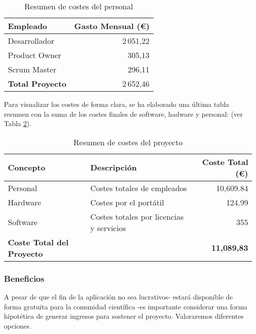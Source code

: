 \begin{enumerate}
		\begin{table}[h]
			\centering
			\begin{tabularx}
				{300}{@{}Xr@{}} \toprule \textbf{Empleado} & \textbf{Gasto Mensual (€)}\\
				\midrule Desarrollador & 2\,051,22 \\ Product Owner & 305,13 \\ Scrum Master
				& 296,11 \\ \midrule \textbf{Total Proyecto} & 2\,652,46 \\ \bottomrule
			\end{tabularx}
			\caption{Resumen de costes del personal}
			\label{tab:costes-empleados}
		\end{table}
\end{enumerate}

Para visualizar los costes de forma clara, se ha elaborado una última tabla resumen con la suma de los costes finales de software, hadware y personal: (ver Tabla \ref{tab:costes-totales}).

\begin{table}[h]
\centering
\begin{tabularx}{\textwidth}{@{}lXr@{}}
\toprule
\textbf{Concepto} & \textbf{Descripción} & \textbf{Coste Total (€)} \\
\midrule
Personal & Costes totales de empleados & 10,609.84 \\
Hardware & Costes por el portátil & 124.99 \\
Software & Costes totales por licencias y servicios & 355 \\
\midrule
\textbf{Coste Total del Proyecto} & & \textbf{11,089,83} \\
\bottomrule
\end{tabularx}
\caption{Resumen de costes del proyecto}
\label{tab:costes-totales}
\end{table}


\subsubsection{Beneficios}

A pesar de que el fin de la aplicación no sea lucrativos- estará disponible de forma gratuita para la comunidad científica -es importante considerar una forma hipotética de generar ingresos para sostener el proyecto. Valoraremos diferentes opciones.

